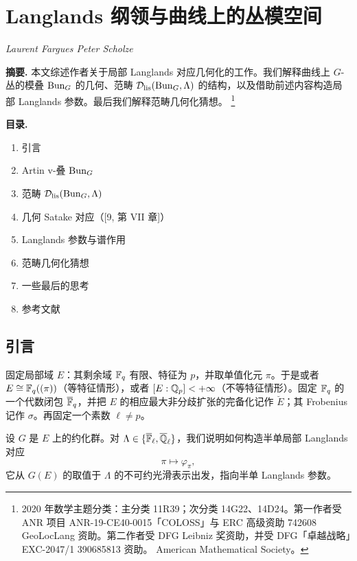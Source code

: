 \chapter{Langlands 纲领与曲线上的丛模空间}
\begin{center}
{\small\itshape Laurent Fargues \quad Peter Scholze}
\end{center}
\medskip

\noindent\textbf{摘要.} 本文综述作者关于局部 Langlands 对应几何化的工作。我们解释曲线上 $G$-丛的模叠 $\operatorname{Bun}_G$ 的几何、范畴 $\mathcal D_{\mathrm{lis}}(\operatorname{Bun}_G,\Lambda)$ 的结构，以及借助前述内容构造局部 Langlands 参数。最后我们解释范畴几何化猜想。
\footnote{2020 年数学主题分类：主分类 11R39；次分类 14G22、14D24。第一作者受 ANR 项目 ANR-19-CE40-0015「COLOSS」与 ERC 高级资助 742608 GeoLocLang 资助。第二作者受 DFG Leibniz 奖资助，并受 DFG「卓越战略」EXC-2047/1 390685813 资助。 American Mathematical Society。}

\medskip
\noindent\textbf{目录.}
\begin{enumerate}[leftmargin=2.2em,itemsep=0.1em]
\item 引言
\item Artin v-叠 $\operatorname{Bun}_G$
\item 范畴 $\mathcal D_{\mathrm{lis}}(\operatorname{Bun}_G,\Lambda)$
\item 几何 Satake 对应（[9, 第 VII 章]）
\item Langlands 参数与谱作用
\item 范畴几何化猜想
\item 一些最后的思考
\item 参考文献
\end{enumerate}

\section{引言}

固定局部域 $E$：其剩余域 $\mathbb{F}_q$ 有限、特征为 $p$，并取单值化元 $\pi$。于是或者 $E\cong\mathbb{F}_q((\pi))$（等特征情形），或者 $[E:\mathbb{Q}_p]<+\infty$（不等特征情形）。固定 $\mathbb{F}_q$ 的一个代数闭包 $\overline{\mathbb{F}}_q$，并把 $E$ 的相应最大非分歧扩张的完备化记作 $\breve E$；其 Frobenius 记作 $\sigma$。再固定一个素数 $\ell\neq p$。

设 $G$ 是 $E$ 上的约化群。对 $\Lambda\in\{\overline{\mathbb{F}}_\ell,\overline{\mathbb{Q}}_\ell\}$，我们说明如何构造半单局部 Langlands 对应
\[
\pi\longmapsto\varphi_\pi,
\]
它从 $G(E)$ 的取值于 $\Lambda$ 的不可约光滑表示出发，指向半单 Langlands 参数。

